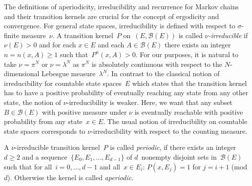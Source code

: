 The definitions of aperiodicity, irreducibility and recurrence for Markov chains and their transition kernels are crucial for the concept of ergodicity and convergence. For general state spaces, irreducibility is defined with respect to $\sigma$-finite measure~$\nu$. A transition kernel~$P$ on~$ \left( E, \mathcal{B}(E) \right) $ is called \textit{$\nu$-irreducible} if $\nu(E) > 0 $ and for each $x \in E$ and each $A \in \mathcal{B}(E)$ there exists an integer $n= n(x,A) \geq 1$ such that~$ P^n (x,A) > 0$. For our purposes, it is natural to take $\nu = \pi^{N}$ or $ \nu = \lambda^{N} $ as $\pi^{N}$ is absolutely continuous with respect to the $N$-dimensional Lebesgue measure~$\lambda^{N}$. In contrast to the classical notion of irreducibility for countable state spaces~$E$ which states that the transition kernel has to have a positive probability of eventually reaching any state from any other state, the notion of $ \nu $-irreducibility is weaker. Here, we want that any subset $B \in \mathcal{B}(E) $ with positive measure under $ \nu $ is eventually reachable with positive probability from any state~$ x \in E $. The usual notion of irreducibility on countable state spaces corresponds to $\nu$-irreducibility with respect to the counting measure.

A $\nu$-irreducible transition kernel~$P$ is called \textit{periodic}, if there exists an integer~$d \geq 2$ and a sequence~$\{ E_0, E_1, \dots, E_{d-1} \}$ of $d$~nonempty disjoint sets in~$\mathcal{B}(E)$ such that for all~$i=0,\dots, d-1$ and all~$x \in E_i$: $ P(x, E_j) =1 $ for $ j = i + 1 $ (mod $d$). Otherwise the kernel is called \textit{aperiodic}.

